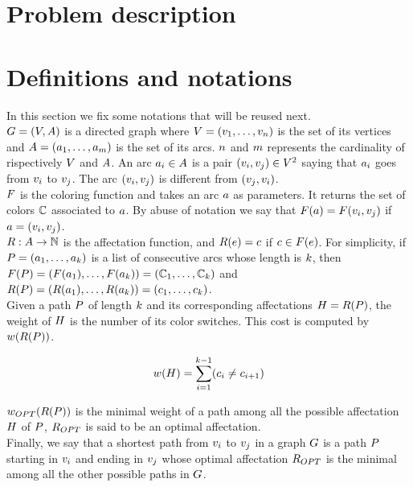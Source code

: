 \section{Problem description}

\section{Definitions and notations}

In this section we fix some notations that will be reused next.\\
$G = (V, A)$ is a directed graph where $V = (v_1,\ldots,v_{n})$ is the set of its vertices and $A = (a_1,\ldots,a_{m})$ is the set of its arcs. $n$ and $m$ represents the cardinality of rispectively $V$ and $A$. An arc $a_i \in A$ is a pair $(v_i, v_j) \in V^2$ saying that $a_i$ goes from $v_i$ to $v_j$. The arc $(v_i, v_j)$ is different from $(v_j, v_i)$.\\
$F$ is the coloring function and takes an arc $a$ as parameters. It returns the set of colors $\mathbb{C}$ associated to $a$. By abuse of notation we say that $F(a) = F(v_i, v_j)$ if $a = (v_i, v_j)$.\\
$R: A \rightarrow \mathbb{N} $ is the affectation function, and $R(e) = c$ if $c \in F(e)$. For simplicity, if $P = (a_1,\ldots,a_{k})$ is a list of consecutive arcs whose length is $k$, then $F(P) = (F(a_1), \dots, F(a_k)) = (\mathbb{C}_1,\ldots,\mathbb{C}_{k})$ and $R(P) = (R(a_1), \dots, R(a_k))  = (c_1,\ldots,c_{k})$.\\
Given a path $P$ of length $k$ and its corresponding affectations $H = R(P)$, the weight of $H$ is the number of its color switches. This cost is computed by $w(R(P))$.

$$ w(H) = \sum\limits_{i = 1}^{k-1} (c_i \neq c_{i+1}) $$

$w_{OPT}(R(P))$ is the minimal weight of a path among all the possible affectation $H$ of $P$, $R_{OPT}$ is said to be an optimal affectation.\\
Finally, we say that a shortest path from $v_i$ to $v_j$ in a graph $G$ is a path $P$ starting in $v_i$ and ending in $v_j$ whose optimal affectation $R_{OPT}$ is the minimal among all the other possible paths in $G$.
